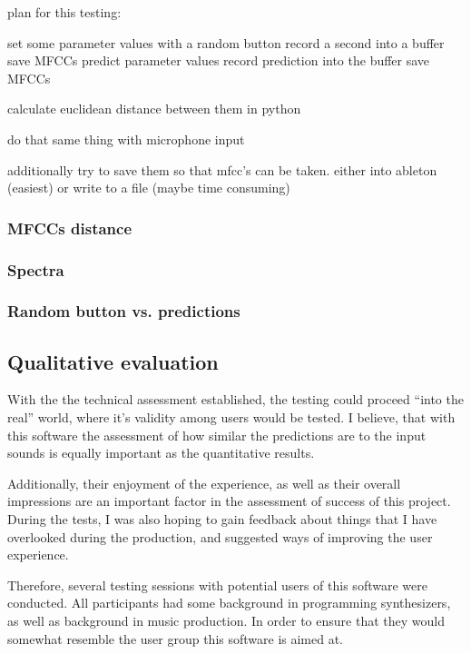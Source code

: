 plan for this testing:

set some parameter values with a random button
record a second into a buffer
save MFCCs
predict parameter values
record prediction into the buffer
save MFCCs

calculate euclidean distance between them in python

do that same thing with microphone input

additionally try to save them so that mfcc's can be taken. either into
ableton (easiest) or write to a file (maybe time consuming)

\subsubsection{MFCCs distance}

\subsubsection{Spectra}

\subsubsection{Random button vs. predictions}

\subsection{Qualitative evaluation}

With the the technical assessment established, the testing could
proceed ``into the real'' world, where it's validity among users would
be tested. I believe, that with this software the assessment of how
similar the predictions are to the input sounds is equally important
as the quantitative results.

Additionally, their enjoyment of the experience, as well as their
overall impressions are an important factor in the assessment of
success of this project. During the tests, I was also hoping to gain
feedback about things that I have overlooked during the production,
and suggested ways of improving the user experience. 

Therefore, several testing sessions with potential users of this
software were conducted. All participants had some background in
programming synthesizers, as well as background in music
production. In order to ensure that they would somewhat resemble the
user group this software is aimed at.

